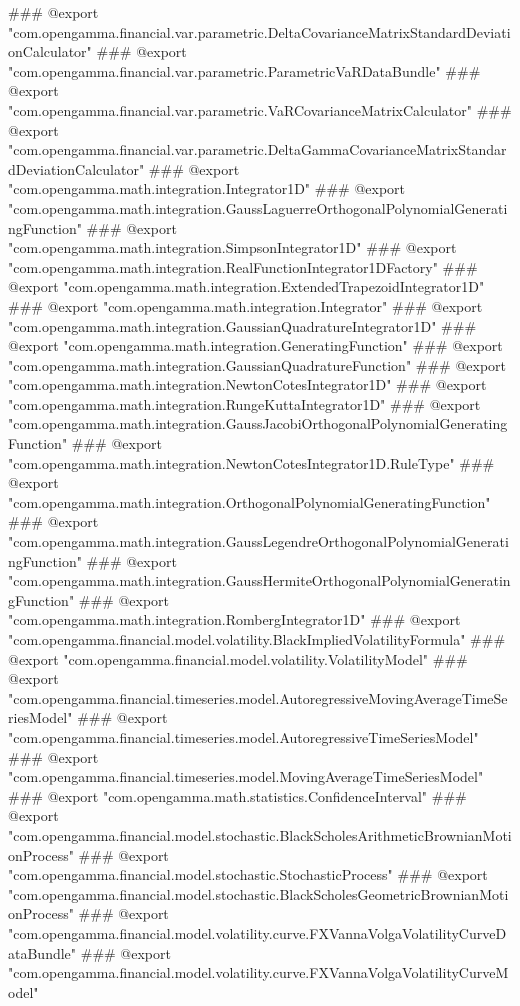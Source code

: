 ### @export "com.opengamma.financial.var.parametric.DeltaCovarianceMatrixStandardDeviationCalculator"
### @export "com.opengamma.financial.var.parametric.ParametricVaRDataBundle"
### @export "com.opengamma.financial.var.parametric.VaRCovarianceMatrixCalculator"
### @export "com.opengamma.financial.var.parametric.DeltaGammaCovarianceMatrixStandardDeviationCalculator"
### @export "com.opengamma.math.integration.Integrator1D"
### @export "com.opengamma.math.integration.GaussLaguerreOrthogonalPolynomialGeneratingFunction"
### @export "com.opengamma.math.integration.SimpsonIntegrator1D"
### @export "com.opengamma.math.integration.RealFunctionIntegrator1DFactory"
### @export "com.opengamma.math.integration.ExtendedTrapezoidIntegrator1D"
### @export "com.opengamma.math.integration.Integrator"
### @export "com.opengamma.math.integration.GaussianQuadratureIntegrator1D"
### @export "com.opengamma.math.integration.GeneratingFunction"
### @export "com.opengamma.math.integration.GaussianQuadratureFunction"
### @export "com.opengamma.math.integration.NewtonCotesIntegrator1D"
### @export "com.opengamma.math.integration.RungeKuttaIntegrator1D"
### @export "com.opengamma.math.integration.GaussJacobiOrthogonalPolynomialGeneratingFunction"
### @export "com.opengamma.math.integration.NewtonCotesIntegrator1D.RuleType"
### @export "com.opengamma.math.integration.OrthogonalPolynomialGeneratingFunction"
### @export "com.opengamma.math.integration.GaussLegendreOrthogonalPolynomialGeneratingFunction"
### @export "com.opengamma.math.integration.GaussHermiteOrthogonalPolynomialGeneratingFunction"
### @export "com.opengamma.math.integration.RombergIntegrator1D"
### @export "com.opengamma.financial.model.volatility.BlackImpliedVolatilityFormula"
### @export "com.opengamma.financial.model.volatility.VolatilityModel"
### @export "com.opengamma.financial.timeseries.model.AutoregressiveMovingAverageTimeSeriesModel"
### @export "com.opengamma.financial.timeseries.model.AutoregressiveTimeSeriesModel"
### @export "com.opengamma.financial.timeseries.model.MovingAverageTimeSeriesModel"
### @export "com.opengamma.math.statistics.ConfidenceInterval"
### @export "com.opengamma.financial.model.stochastic.BlackScholesArithmeticBrownianMotionProcess"
### @export "com.opengamma.financial.model.stochastic.StochasticProcess"
### @export "com.opengamma.financial.model.stochastic.BlackScholesGeometricBrownianMotionProcess"
### @export "com.opengamma.financial.model.volatility.curve.FXVannaVolgaVolatilityCurveDataBundle"
### @export "com.opengamma.financial.model.volatility.curve.FXVannaVolgaVolatilityCurveModel"
